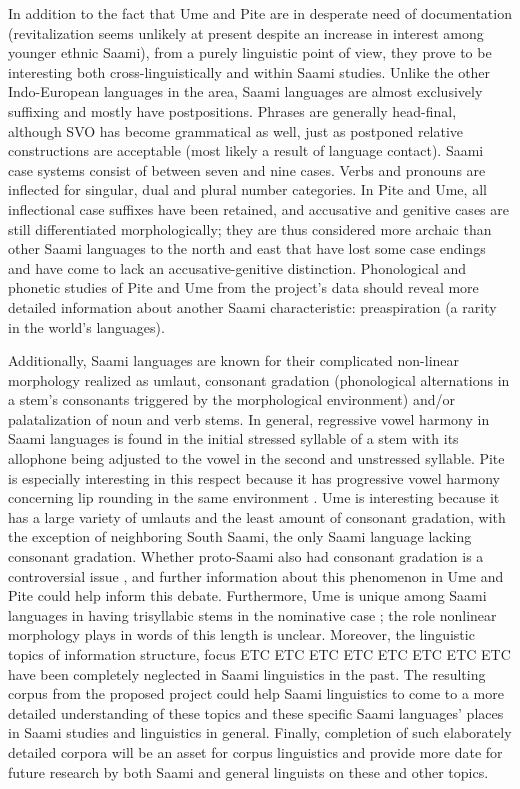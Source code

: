 \documentclass[a4paper,12pt]{article}
\begin{document}
In addition to the fact that Ume and Pite are in desperate need of documentation (revitalization seems unlikely at present despite an increase in interest among younger ethnic Saami), from a purely linguistic point of view, they prove to be interesting both cross-linguistically and within Saami studies. Unlike the other Indo-European languages in the area, Saami languages are almost exclusively suffixing and mostly have postpositions. Phrases are generally head-final, although SVO has become grammatical as well, just as postponed relative constructions are acceptable (most likely a result of language contact). Saami case systems consist of between seven and nine cases. Verbs and pronouns are inflected for singular, dual and plural number categories. In Pite and Ume, all inflectional case suffixes have been retained, and accusative and genitive cases are still differentiated morphologically; they are thus considered more archaic than other Saami languages to the north and east that have lost some case endings and have come to lack an accusative-genitive distinction. Phonological and phonetic studies of Pite and Ume from the project's data should reveal more detailed information about another Saami characteristic: preaspiration (a rarity in the world's languages).

Additionally, Saami languages are known for their complicated non-linear morphology realized as umlaut, consonant gradation (phonological alternations in a stem's consonants triggered by the morphological environment) and/or palatalization of noun and verb stems. In general, regressive vowel harmony in Saami languages is found in the initial stressed syllable of a stem with its allophone being adjusted to the vowel in the second and unstressed syllable. Pite is especially interesting in this respect because it has progressive vowel harmony concerning lip rounding in the same environment \cite[272]{korhonen2005a}. Ume is interesting because it has a large variety of umlauts and the least amount of consonant gradation, with the exception of neighboring South Saami, the only Saami language lacking consonant gradation. Whether proto-Saami also had consonant gradation is a controversial issue \cite[cf.][154–55]{svonni2006}, and further information about this phenomenon in Ume and Pite could help inform this debate. Furthermore, Ume is unique among Saami languages in having trisyllabic stems in the nominative case \cite[421]{korhonen2005b}; the role nonlinear morphology plays in words of this length is unclear. Moreover, the linguistic topics of information structure, focus ETC ETC ETC ETC ETC ETC ETC ETC have been completely neglected in Saami linguistics in the past.
The resulting corpus from the proposed project could help Saami linguistics to come to a more detailed understanding of %
these topics and these specific Saami languages' places in Saami studies and linguistics in general. Finally, completion of such elaborately detailed corpora will be an asset for corpus linguistics and provide more date for future research by both Saami and general linguists on these and other topics.
\end{document}
